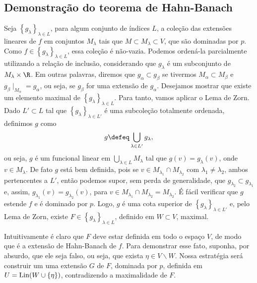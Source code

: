 \subsection{Demonstração do teorema de Hahn-Banach}

Seja \( \left\{ g_{ \lambda } \right\}_{ \lambda \in L } \), para algum conjunto de índices \( L \), a coleção das extensões lineares de \( f \) em conjuntos \( M_{ \lambda } \) tais que \( M \subset  M_{ \lambda } \subset V \), que são dominadas por \( p \).
Como \( f \in \left\{ g_{ \lambda } \right\}_{ \lambda \in L } \), essa coleção é não-vazia.
Podemos ordená-la parcialmente utilizando a relação de inclusão, considerando que \( g_{ \lambda } \) é um subconjunto de \( M_{ \lambda } \times \R \).
Em outras palavras, diremos que \( g_{ \alpha } \subset g_{ \beta } \) se tivermos \( M_{ \alpha } \subset M_{ \beta } \) e \( g_{ \beta } \mid_{ M_{ \alpha } } = g_{ \alpha } \), ou seja, se \( g_{ \beta } \) for uma extensão de \( g_{ \alpha } \).
Desejamos mostrar que existe um elemento maximal de \( \left\{ g_{ \lambda } \right\}_{ \lambda \in L } \).
Para tanto, vamos aplicar o Lema de Zorn.
Dado \( L' \subset L \) tal que \( \left\{ g_{ \lambda } \right\}_{ \lambda \in L' } \) é uma subcoleção totalmente ordenada, definimos \( g \) como \[
    g \defeq \bigcup_{ \lambda \in L' } g_{ \lambda }
,\]
ou seja, \( g \) é um funcional linear em \( \bigcup_{ \lambda \in L } M_{ \lambda } \) tal que \( g(v) = g_{ \lambda } (v) \), onde \( v \in M_{ \lambda } \).
De fato \( g \) está bem definida, pois se \( v \in M_{ \lambda_{ 1 } } \cap M_{ \lambda_{ 2 } } \) com \( \lambda_{ 1 } \neq \lambda_{ 2 } \), ambos pertencentes a \( L' \), então podemos supor, sem perda de generalidade, que \( g_{ \lambda_{ 2 } } \subset g_{ \lambda_{ 1 } } \) e, assim, \( g_{ \lambda_{ 1 } } (v) = g_{ \lambda_{ 2 } }(v) \), para \( v \in M_{ \lambda_{ 1 } } \cap M_{ \lambda_{ 2 } } = M_{ \lambda_{ 2 } } \). 
É fácil verificar que \( g \) estende \( f \) e é dominado por \( p \).
Logo, \( g \) é uma cota superior de \( \left\{ g_{ \lambda } \right\}_{ \lambda \in L' } \) e, pelo Lema de Zorn, existe \( F \in \left\{ g_{ \lambda } \right\}_{ \lambda \in L } \), definido em \( W \subset  V \), maximal.

Intuitivamente é claro que \( F \) deve estar definida em todo o espaço \( V \), de modo que é a extensão de Hahn-Banach de \( f \).
Para demonstrar esse fato, suponha, por absurdo, que ele seja falso, ou seja, que exista \( \eta \in V \backslash W \).
Nossa estratégia será construir um uma extensão \( G \) de \( F \), dominada por \( p \), definida em \( U = \operatorname{Lin} (W \cup \left\{ \eta \right\}) \), contradizendo a maximalidade de \( F \).

